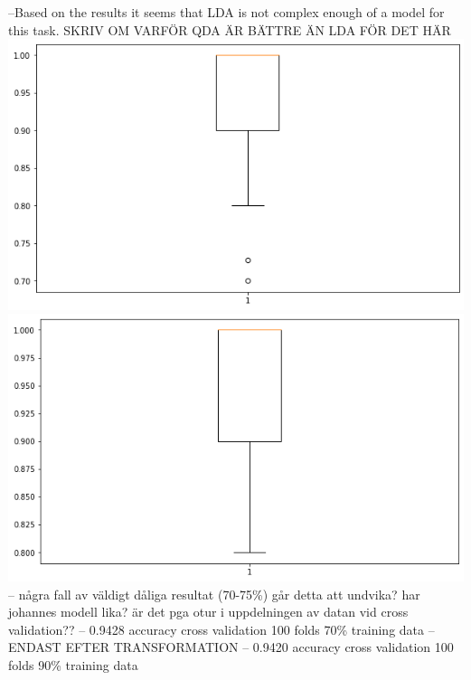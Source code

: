 \documentclass[../../project.tex]{subfiles}
\begin{document}
	--Based on the results it seems that LDA is not complex enough of a model for this task. SKRIV OM VARFÖR QDA ÄR BÄTTRE ÄN LDA FÖR DET HÄR
	\includegraphics[scale=0.3]{boxplotQDA.png}
	\includegraphics[scale=0.3]{boxplotQDA90.png}
	-- några fall av väldigt dåliga resultat (70-75\%) går detta att undvika? har johannes modell lika? är det pga otur i uppdelningen av datan vid cross validation??
	-- 0.9428 accuracy cross validation 100 folds 70\% training data
	-- ENDAST EFTER TRANSFORMATION
	-- 0.9420 accuracy cross validation 100 folds 90\% training data
\end{document}
